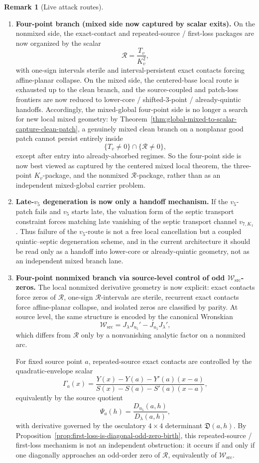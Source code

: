 \documentclass[11pt,a4paper]{amsart}
\theoremstyle{plain}
\theoremstyle{definition}
\newtheorem{remark}[theorem]{Remark}
\begin{document}
\begin{remark}[Live attack routes]
\begin{enumerate}
\item
\textbf{Four-point branch (mixed side now captured by scalar exits).}
On the nonmixed side, the exact-contact and repeated-source / first-loss
packages are now organized by the scalar
\[
\mathcal R=\frac{T_v}{K_v^2},
\]
with one-sign intervals sterile and interval-persistent exact contacts forcing
affine-planar collapse. On the mixed side, the centered-base local route is
exhausted up to the clean branch, and the source-coupled and patch-loss
frontiers are now reduced to lower-core / shifted-$3$-point /
already-quintic handoffs. Accordingly, the mixed-global four-point side is no longer a search for new
local mixed geometry: by
Theorem~\ref{thm:global-mixed-to-scalar-capture-clean-patch}, a genuinely mixed
clean branch on a nonplanar good patch cannot persist entirely inside
\[
\{T_v\neq 0\}\cap\{\mathcal R\neq 0\},
\]
except after entry into already-absorbed regimes. So the four-point side is now
best viewed as captured by the centered mixed local theorem, the three-point
$K_v$-package, and the nonmixed $\mathcal R$-package, rather than as an
independent mixed-global carrier problem.

\item
\textbf{Late-$v_5$ degeneration is now only a handoff mechanism.}
If the $v_5$-patch fails and $v_5$ starts late, the valuation form of the
septic transport constraint forces matching late vanishing of the septic
transport channel $v_{7,K_1}$. Thus failure of the $v_5$-route is not a free
local cancellation but a coupled quintic--septic degeneration scheme, and in
the current architecture it should be read only as a handoff into lower-core or
already-quintic geometry, not as an independent mixed branch lane.

\item
\textbf{Four-point nonmixed branch via source-level control of odd $\mathcal W_{\mathrm{src}}$-zeros.}
The local nonmixed derivative geometry is now explicit: exact contacts force
zeros of $\mathcal R$, one-sign $\mathcal R$-intervals are sterile,
recurrent exact contacts force affine-planar collapse, and isolated zeros are
classified by parity. At source level, the same structure is encoded by the
canonical Wronskian
\[
\mathcal W_{\mathrm{src}}=J_\lambda J_{u_5}'-J_{u_5}J_\lambda',
\]
which differs from $\mathcal R$ only by a nonvanishing analytic factor on a
nonmixed arc.

For fixed source point $a$, repeated-source exact contacts are controlled by
the quadratic-envelope scalar
\[
\Gamma_a(x)=
\frac{Y(x)-Y(a)-Y'(a)(x-a)}
{S(x)-S(a)-S'(a)(x-a)},
\]
equivalently by the source quotient
\[
\Psi_a(h)=\frac{D_{u_5}(a,h)}{D_\lambda(a,h)},
\]
with derivative governed by the osculatory $4\times 4$ determinant
$\mathfrak D(a,h)$. By
Proposition~\ref{prop:first-loss-is-diagonal-odd-zero-birth},
this repeated-source / first-loss mechanism is not an independent obstruction:
it occurs if and only if one diagonally approaches an odd-order zero of
$\mathcal R$, equivalently of $\mathcal W_{\mathrm{src}}$.


\end{enumerate}
\end{remark}
\end{document}
